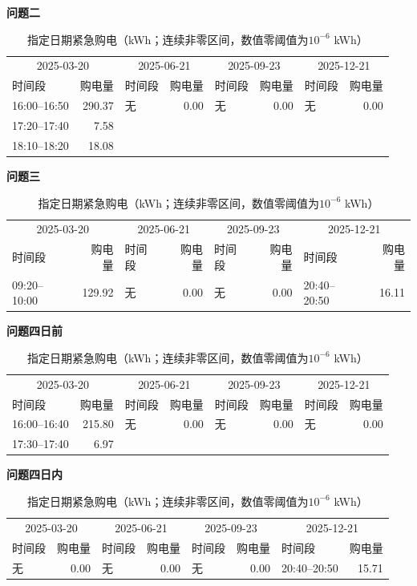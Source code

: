 \begin{table}[H]\centering\footnotesize\setlength{\tabcolsep}{3.5pt}
\caption{指定日期紧急购电（kWh；连续非零区间，数值零阈值为$10^{-6}$ kWh）}
\textbf{问题二}\\
\begin{tabular}{lr lr lr lr}\toprule
\multicolumn{2}{c}{2025-03-20} & \multicolumn{2}{c}{2025-06-21} & \multicolumn{2}{c}{2025-09-23} & \multicolumn{2}{c}{2025-12-21}\\
时间段 & 购电量 & 时间段 & 购电量 & 时间段 & 购电量 & 时间段 & 购电量\\\midrule
16:00--16:50 & 290.37 & 无 & 0.00 & 无 & 0.00 & 无 & 0.00\\
17:20--17:40 & 7.58 &  &  &  &  &  & \\
18:10--18:20 & 18.08 &  &  &  &  &  & \\
\bottomrule\end{tabular}\par\medskip
\textbf{问题三}\\
\begin{tabular}{lr lr lr lr}\toprule
\multicolumn{2}{c}{2025-03-20} & \multicolumn{2}{c}{2025-06-21} & \multicolumn{2}{c}{2025-09-23} & \multicolumn{2}{c}{2025-12-21}\\
时间段 & 购电量 & 时间段 & 购电量 & 时间段 & 购电量 & 时间段 & 购电量\\\midrule
09:20--10:00 & 129.92 & 无 & 0.00 & 无 & 0.00 & 20:40--20:50 & 16.11\\
\bottomrule\end{tabular}\par\medskip
\textbf{问题四日前}\\
\begin{tabular}{lr lr lr lr}\toprule
\multicolumn{2}{c}{2025-03-20} & \multicolumn{2}{c}{2025-06-21} & \multicolumn{2}{c}{2025-09-23} & \multicolumn{2}{c}{2025-12-21}\\
时间段 & 购电量 & 时间段 & 购电量 & 时间段 & 购电量 & 时间段 & 购电量\\\midrule
16:00--16:40 & 215.80 & 无 & 0.00 & 无 & 0.00 & 无 & 0.00\\
17:30--17:40 & 6.97 &  &  &  &  &  & \\
\bottomrule\end{tabular}\par\medskip
\textbf{问题四日内}\\
\begin{tabular}{lr lr lr lr}\toprule
\multicolumn{2}{c}{2025-03-20} & \multicolumn{2}{c}{2025-06-21} & \multicolumn{2}{c}{2025-09-23} & \multicolumn{2}{c}{2025-12-21}\\
时间段 & 购电量 & 时间段 & 购电量 & 时间段 & 购电量 & 时间段 & 购电量\\\midrule
无 & 0.00 & 无 & 0.00 & 无 & 0.00 & 20:40--20:50 & 15.71\\
\bottomrule\end{tabular}
\end{table}
